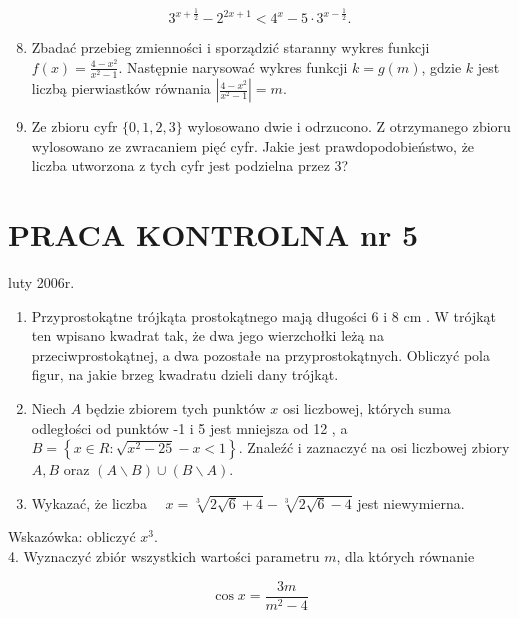 \documentclass[10pt]{article}
\begin{document}
$$
3^{x+\frac{1}{2}}-2^{2 x+1}<4^{x}-5 \cdot 3^{x-\frac{1}{2}} .
$$

\begin{enumerate}
  \setcounter{enumi}{7}
  \item Zbadać przebieg zmienności i sporządzić staranny wykres funkcji $f(x)=\frac{4-x^{2}}{x^{2}-1}$. Następnie narysować wykres funkcji $k=g(m)$, gdzie $k$ jest liczbą pierwiastków równania $\left|\frac{4-x^{2}}{x^{2}-1}\right|=m$.
  \item Ze zbioru cyfr $\{0,1,2,3\}$ wylosowano dwie i odrzucono. Z otrzymanego zbioru wylosowano ze zwracaniem pięć cyfr. Jakie jest prawdopodobieństwo, że liczba utworzona z tych cyfr jest podzielna przez 3?
\end{enumerate}

\section*{PRACA KONTROLNA nr 5}
luty 2006r.

\begin{enumerate}
  \item Przyprostokątne trójkąta prostokątnego mają długości 6 i 8 cm . W trójkąt ten wpisano kwadrat tak, że dwa jego wierzchołki leżą na przeciwprostokątnej, a dwa pozostałe na przyprostokątnych. Obliczyć pola figur, na jakie brzeg kwadratu dzieli dany trójkąt.
  \item Niech $A$ będzie zbiorem tych punktów $x$ osi liczbowej, których suma odległości od punktów -1 i 5 jest mniejsza od 12 , a $B=\left\{x \in R: \sqrt{x^{2}-25}-x<1\right\}$. Znaleźć i zaznaczyć na osi liczbowej zbiory $A, B$ oraz $(A \backslash B) \cup(B \backslash A)$.
  \item Wykazać, że liczba $\quad x=\sqrt[3]{2 \sqrt{6}+4}-\sqrt[3]{2 \sqrt{6}-4}$ jest niewymierna.
\end{enumerate}

Wskazówka: obliczyć $x^{3}$.\\
4. Wyznaczyć zbiór wszystkich wartości parametru $m$, dla których równanie

$$
\cos x=\frac{3 m}{m^{2}-4}
$$
\end{document}
